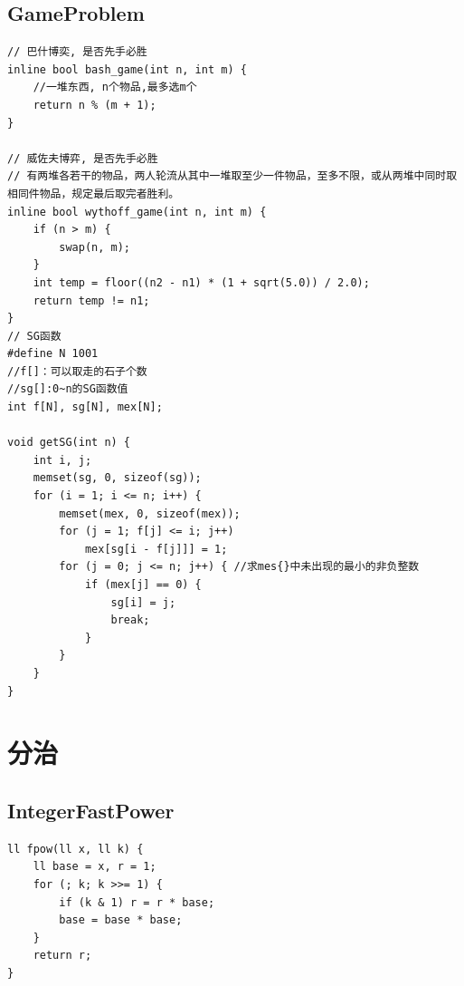 \documentclass[twoside]{article}
\begin{document}
\subsection{GameProblem}
\begin{lstlisting}
// 巴什博奕, 是否先手必胜
inline bool bash_game(int n, int m) {
    //一堆东西, n个物品,最多选m个
    return n % (m + 1);
}

// 威佐夫博弈, 是否先手必胜
// 有两堆各若干的物品，两人轮流从其中一堆取至少一件物品，至多不限，或从两堆中同时取相同件物品，规定最后取完者胜利。
inline bool wythoff_game(int n, int m) {
    if (n > m) {
        swap(n, m);
    }
    int temp = floor((n2 - n1) * (1 + sqrt(5.0)) / 2.0);
    return temp != n1;
}
// SG函数
#define N 1001
//f[]：可以取走的石子个数
//sg[]:0~n的SG函数值
int f[N], sg[N], mex[N];

void getSG(int n) {
    int i, j;
    memset(sg, 0, sizeof(sg));
    for (i = 1; i <= n; i++) {
        memset(mex, 0, sizeof(mex));
        for (j = 1; f[j] <= i; j++)
            mex[sg[i - f[j]]] = 1;
        for (j = 0; j <= n; j++) { //求mes{}中未出现的最小的非负整数
            if (mex[j] == 0) {
                sg[i] = j;
                break;
            }
        }
    }
}
\end{lstlisting}
\clearpage\section{分治}
\subsection{IntegerFastPower}
\begin{lstlisting}
ll fpow(ll x, ll k) {
    ll base = x, r = 1;
    for (; k; k >>= 1) {
        if (k & 1) r = r * base;
        base = base * base;
    }
    return r;
}\end{lstlisting}
\end{document}
